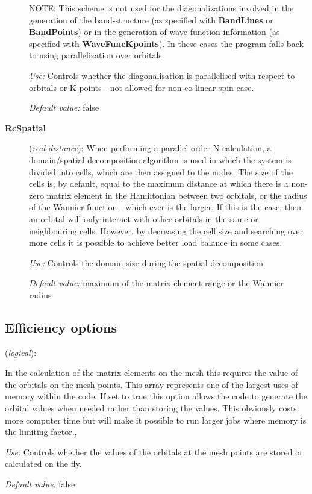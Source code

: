 \documentclass[11pt]{article}
\begin{document}
\begin{description}
NOTE: This scheme is not used for the diagonalizations involved in the
generation of the band-structure (as specified with {\bf BandLines} or
{\bf BandPoints}) or in the generation of wave-function information
(as specified with {\bf WaveFuncKpoints}). In these cases the program
falls back to using parallelization over orbitals.

{\it Use:} Controls whether the diagonalisation is parallelised with
respect to orbitals or K points - not allowed for non-co-linear spin
case.

{\it Default value:}  false

\item[{\bf RcSpatial}] ({\it real distance}):
When performing a parallel order N calculation, a domain/spatial
decomposition algorithm is used in which the system is divided into
cells, which are then assigned to the nodes. The size of the cells
is, by default, equal to the maximum distance at which there is a non-zero 
matrix element in the Hamiltonian between two orbitals, or the
radius of the Wannier function - which ever is the larger. If this is 
the case, then an orbital will only interact with other orbitals in the same
or neighbouring cells. However, by decreasing the cell size and searching
over more cells it is possible to achieve better load balance in some
cases.

{\it Use:} Controls the domain size during the spatial decomposition

{\it Default value:}  maximum of the matrix element range or the Wannier radius

\end{description}


\vspace{5pt}
\subsection{Efficiency options}

\begin{description}
\itemsep 10pt
\parsep 0pt

\item[{\bf DirectPhi}] ({\it logical}):

In the calculation of the matrix elements on the mesh this requires the
value of the orbitals on the mesh points. This array represents one of
the largest uses of memory within the code. If set to true this option
allows the code to generate the orbital values when needed rather than
storing the values. This obviously costs more computer time but will
make it possible to run larger jobs where memory is the limiting factor.,

{\it Use:} Controls whether the values of the orbitals at the mesh points
  are stored or calculated on the fly.

{\it Default value:}  false

\end{description}
\end{document}
